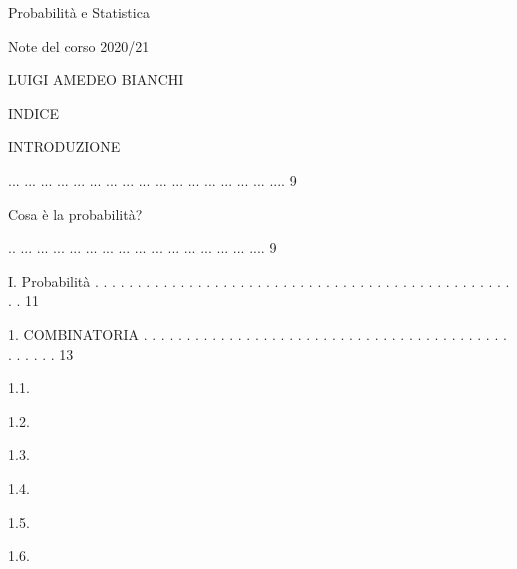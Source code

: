 \documentclass[a4paper,portrait,12pt]{article}
\begin{document}
\begin{flushleft}
Probabilit\`{a} e Statistica
\end{flushleft}


\begin{flushleft}
Note del corso 2020/21
\end{flushleft}


\begin{flushleft}
LUIGI AMEDEO BIANCHI
\end{flushleft}





\begin{flushleft}
\newpage
\newpage
\newpage
\newpage
INDICE
\end{flushleft}


\begin{flushleft}
INTRODUZIONE
\end{flushleft}





... ... ... ... ... ... ... ... ... ... ... ... ... ... ... ... .... 9





\begin{flushleft}
Cosa \`{e} la probabilit\`{a}?
\end{flushleft}





.. ... ... ... ... ... ... ... ... ... ... ... ... ... ... .... 9





\begin{flushleft}
I. Probabilit\`{a} . . . . . . . . . . . . . . . . . . . . . . . . . . . . . . . . . . . . . . . . . . . . . . . . . . . 11
\end{flushleft}


\begin{flushleft}
1. COMBINATORIA . . . . . . . . . . . . . . . . . . . . . . . . . . . . . . . . . . . . . . . . . . . . . . . . . 13
\end{flushleft}


1.1.


1.2.


1.3.


1.4.


1.5.


1.6.
\end{document}
